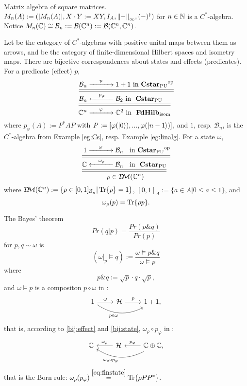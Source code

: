 \begin{Eg}\label{eg:linalg}
Matrix algebra of square matrices. $M_n(A) := (|M_n(A)|, X \cdot Y := XY, I_A, \norm{-}_{\infty}, (-)^\dagger)$
 for $n \in \Bbb{N}$ is a $C^*$-algebra. Notice
$M_n(\Bbb{C}) \cong \mathcal{B}_n := \mathcal{B}(\Bbb{C}^n) := \mathcal{B}(\Bbb{C}^n, \Bbb{C}^n)$.
\end{Eg}

Let  be the category of $C^*$-algebras with positive unital maps between them as arrows, and  be the category of finite-dimensional Hilbert spaces and isometry maps. There are bijective correspondences about states and effects (predicates). For a predicate (effect) $p$,
\begin{equation} \label{bij:effect}
\begin{prooftree}
    \hypo{ \mathcal{B}_n &\xrightarrow{\mathmakebox[3em]{p}} 1+1 \text{   in \opposite{\ctCstar{PU}}}}
    \infer[double]1{ \mathcal{B}_n &\xleftarrow{\mathmakebox[3em]{p_{\varphi}}} \mathcal{B}_2 \text{   in \ctCstar{PU}}}
    \infer[double]1{\Cs^n &\xrightarrow{\mathmakebox[3em]{\varphi}} \Cs^2  \text{   in \ctFH{isom}}}
\end{prooftree}
\end{equation}
where $p_{\varphi}(A) := P^*AP$ with $P:=[\varphi(\ket{0}), ..., \varphi(\ket{n-1})]$, and $1$, resp. $\mathcal{B}_n$, is the $C^*$-algebra from Example \ref{eg:Cs}, resp. Example \ref{eg:linalg}.
For a state $\omega$,
\begin{equation} \label{bij:state}
\begin{prooftree}
    \hypo{ 1 \xrightarrow{\mathmakebox[3em]{\omega}} \mathcal{B}_n &\text{   in \opposite{\ctCstar{PU}}}}
    \infer[double]1{\Bbb{C} \xleftarrow{\mathmakebox[3em]{\omega_{\rho}}} \mathcal{B}_n &\text{   in \ctCstar{PU}}}
    \infer[double]1{\rho \in \DM{\Bbb{C}^n}}
\end{prooftree}
\end{equation}
where $\DM{\Cs^n} := \{\rho \in [0,1]_{\mathcal{B}_n}|\Tr{\rho}=1\}$, $[0,1]_A := \{a \in A| 0 \le a \le 1\}$, and  
\begin{equation} \label{eq:finstate}
\omega_{\rho}(p) = \Tr{\rho p}.    
\end{equation}

The Bayes' theorem
\[
Pr(q | p) = \frac{Pr(p \& q)}{Pr(p)}
\]
for $p,q \sim \omega$ is
\[
(\omega |_p \vDash q) := \frac{\omega \vDash p \& q}{\omega \vDash p}
\]
where 
\[
p \& q := \sqrt{p} \cdot q \cdot \sqrt{p},
\] 
and $\omega \vDash p$ is a compositon $ p \circ \omega$ in :
\[\begin{tikzcd}
1 \ar[r, "\omega"] \ar[bend right]{rr}[swap]{p \circ \omega} & \mathcal{H} \ar[r, "p"] & 1+1,
\end{tikzcd}\] that is, according to \eqref{bij:effect} and \eqref{bij:state}, $\omega_{\rho} \circ p_{\varphi}$ in : 
\[\begin{tikzcd}
\Cs  & \mathcal{H} \ar[swap, l, "\omega_{\rho}"]  & \Cs  \oplus \Cs, \ar[swap, l, "p_{\varphi}"] \ar[bend left]{ll}{\omega_{\rho} \circ p_{\varphi}}
\end{tikzcd}\] that is the Born rule: $\omega_{\rho}(p_{\varphi}) \stackrel{\eqref{eq:finstate}}{=} \Tr{\rho PP^*}$.
